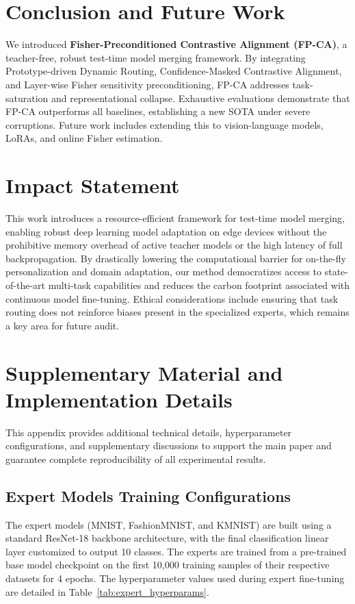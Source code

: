 \documentclass{article}
\theoremstyle{plain}
\theoremstyle{definition}
\theoremstyle{remark}
\begin{document}
\section{Conclusion and Future Work}
\label{conclusion}
We introduced \textbf{Fisher-Preconditioned Contrastive Alignment (FP-CA)}, a teacher-free, robust test-time model merging framework. By integrating Prototype-driven Dynamic Routing, Confidence-Masked Contrastive Alignment, and Layer-wise Fisher sensitivity preconditioning, FP-CA addresses task-saturation and representational collapse. Exhaustive evaluations demonstrate that FP-CA outperforms all baselines, establishing a new SOTA under severe corruptions. Future work includes extending this to vision-language models, LoRAs, and online Fisher estimation.

\section*{Impact Statement}
This work introduces a resource-efficient framework for test-time model merging, enabling robust deep learning model adaptation on edge devices without the prohibitive memory overhead of active teacher models or the high latency of full backpropagation. By drastically lowering the computational barrier for on-the-fly personalization and domain adaptation, our method democratizes access to state-of-the-art multi-task capabilities and reduces the carbon footprint associated with continuous model fine-tuning. Ethical considerations include ensuring that task routing does not reinforce biases present in the specialized experts, which remains a key area for future audit.

\newpage
\clearpage



\newpage
\clearpage
\appendix
\section{Supplementary Material and Implementation Details}

This appendix provides additional technical details, hyperparameter configurations, and supplementary discussions to support the main paper and guarantee complete reproducibility of all experimental results.

\subsection{Expert Models Training Configurations}
The expert models (MNIST, FashionMNIST, and KMNIST) are built using a standard ResNet-18 backbone architecture, with the final classification linear layer customized to output 10 classes. The experts are trained from a pre-trained base model checkpoint on the first 10,000 training samples of their respective datasets for 4 epochs. The hyperparameter values used during expert fine-tuning are detailed in Table~\ref{tab:expert_hyperparams}.
\end{document}
